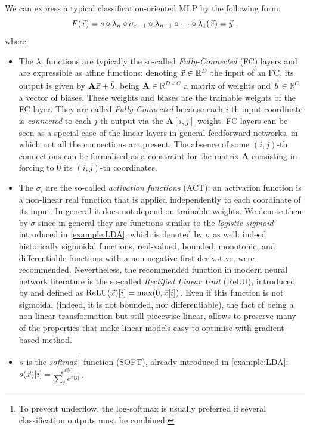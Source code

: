 We can express a typical classification-oriented MLP by the following form:
\begin{equation}\label{eq:MLP}
F(\vec{x}) = s\circ\lambda_n\circ\sigma_{n-1}\circ\lambda_{n-1}\circ\dots\circ \lambda_1(\vec{x})=\vec{y} \mbox{ ,}
\end{equation}
where:
\begin{itemize}
\item The $\lambda_i$ functions are typically the so-called \emph{Fully-Connected} (FC) layers and are expressible as affine functions: denoting $\vec{x}\in\mathbb{R}^D$ the input of an FC, its output is given by $\textbf{A}\vec{x} + \vec{b}$, being $\textbf{A}\in\mathbb{R}^{D\times C}$ a matrix of weights and $\vec{b}\in\mathbb{R}^C$ a vector of biases. These weights and biases are the trainable weights of the FC layer. They are called \emph{Fully-Connected} because each $i$-th input coordinate is \emph{connected} to each $j$-th output via the $\textbf{A}[i,j]$ weight. FC layers can be seen as a special case of the linear layers in general feedforward networks, in which not all the connections are present. The absence of some $(i,j)$-th connections can be formalised as a constraint for the matrix $\textbf{A}$ consisting in forcing to $0$ its $(i,j)$-th coordinates.

\item  The $\sigma_i$ are the so-called \emph{activation functions} (ACT): an activation function is a non-linear real function that is applied independently to each coordinate of its input. In general it does not depend on trainable weights. We denote them by $\sigma$ since in general they are functions similar to the \emph{logistic sigmoid} introduced in \ref{example:LDA}, which is denoted by $\sigma$ as well: indeed historically sigmoidal functions, \ie real-valued, bounded, monotonic, and differentiable functions with a non-negative first derivative, were recommended. Nevertheless, the recommended function in modern neural network literature is the so-called \emph{Rectified Linear Unit} (ReLU), introduced by \cite{nair2010rectified} and defined as $\mathrm{ReLU}(\vec{x})[i] = \max(0,\vec{x}[i])$. Even if this function is not sigmoidal (indeed, it is not bounded, nor differentiable), the fact of being a non-linear transformation but still piecewise linear, allows to preserve many of the properties that make linear models easy to optimise with gradient-based method.
 

\item $s$ is the \emph{softmax}\footnote{To prevent underflow, the log-softmax is usually preferred if several classification outputs must be combined.} function (SOFT), already introduced in \ref{example:LDA}: $s(\vec{x})[i] = \frac{e^{\vec{x}[i]}}{\sum_{j}e^{\vec{x}[j]}}$.
\end{itemize}
 
